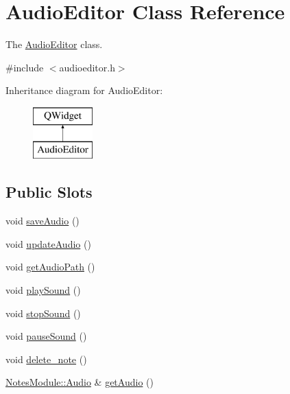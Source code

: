 \hypertarget{class_audio_editor}{\section{Audio\-Editor Class Reference}
\label{class_audio_editor}
}


The \hyperlink{class_audio_editor}{Audio\-Editor} class.  




{\ttfamily \#include $<$audioeditor.\-h$>$}

Inheritance diagram for Audio\-Editor\-:\begin{figure}[H]
\begin{center}
\leavevmode
\includegraphics[height=2.000000cm]{class_audio_editor}
\end{center}
\end{figure}
\subsection*{Public Slots}
\begin{DoxyCompactItemize}
\item 
void \hyperlink{class_audio_editor_a1d8a77bda7a8cb02ea5e2d9b07fc3f8e}{save\-Audio} ()
\item 
void \hyperlink{class_audio_editor_a190458291887d18628cb56a0d524d2db}{update\-Audio} ()
\item 
void \hyperlink{class_audio_editor_a81a494cad553cfbcc9b23fc161f08437}{get\-Audio\-Path} ()
\item 
void \hyperlink{class_audio_editor_a186e536eef0f41703a344c003a876a8d}{play\-Sound} ()
\item 
void \hyperlink{class_audio_editor_ae907eb19dd07c9de642120d5b2184ecc}{stop\-Sound} ()
\item 
void \hyperlink{class_audio_editor_a09d37b3df24e5a9018a45ba9182a3bd4}{pause\-Sound} ()
\item 
void \hyperlink{class_audio_editor_ab1531effa0b1dff6fc34c6f074d0c53a}{delete\-\_\-note} ()
\item 
\hyperlink{class_notes_module_1_1_audio}{Notes\-Module\-::\-Audio} \& \hyperlink{class_audio_editor_a06cccab27d70534589159fbc39d15819}{get\-Audio} ()
\end{DoxyCompactItemize}
